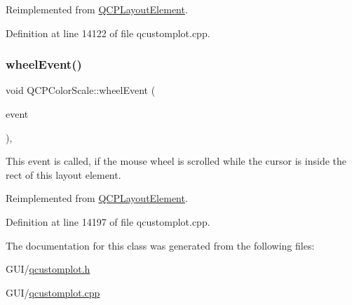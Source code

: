 Reimplemented from \hyperlink{class_q_c_p_layout_element_a929c2ec62e0e0e1d8418eaa802e2af9b}{Q\+C\+P\+Layout\+Element}.



Definition at line 14122 of file qcustomplot.\+cpp.

\mbox{\label{class_q_c_p_color_scale_ab398e14c01240f3dc855884fe9e1ee8c}} 
\subsubsection{\texorpdfstring{wheel\+Event()}{wheelEvent()}}
{\footnotesize\ttfamily void Q\+C\+P\+Color\+Scale\+::wheel\+Event (\begin{DoxyParamCaption}\item[{Q\+Wheel\+Event $\ast$}]{event }\end{DoxyParamCaption})\hspace{0.3cm}{\ttfamily [protected]}, {\ttfamily [virtual]}}

This event is called, if the mouse wheel is scrolled while the cursor is inside the rect of this layout element. 

Reimplemented from \hyperlink{class_q_c_p_layout_element_a300521d2fd18a893c1b85f6be11ce2bf}{Q\+C\+P\+Layout\+Element}.



Definition at line 14197 of file qcustomplot.\+cpp.



The documentation for this class was generated from the following files\+:\begin{DoxyCompactItemize}
\item 
G\+U\+I/\hyperlink{qcustomplot_8h}{qcustomplot.\+h}\item 
G\+U\+I/\hyperlink{qcustomplot_8cpp}{qcustomplot.\+cpp}\end{DoxyCompactItemize}
